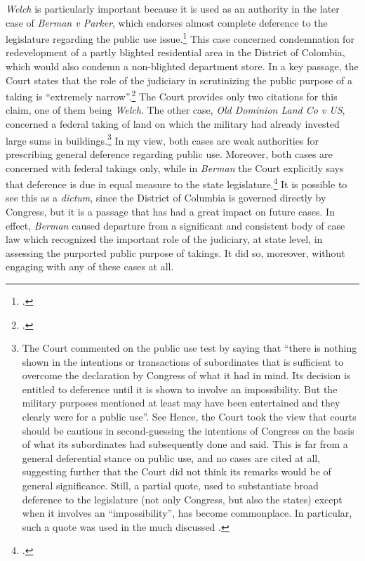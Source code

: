 {\it Welch} is particularly important because it is used as an authority in the later case of {\it Berman v Parker}, which endorses almost complete deference to the legislature regarding the public use issue.\footcite[32]{berman54} This case concerned condemnation for redevelopment of a partly blighted residential area in the District of Colombia, which would also condemn a non-blighted department store. In a key passage, the Court states that the role of the judiciary in scrutinizing the public purpose of a taking is ``extremely narrow''.\footcite[32]{berman54} The Court provides only two citations for this claim, one of them being {\it Welch}. The other case, {\it Old Dominion Land Co v US}, concerned a federal taking of land on which the military had already invested large sums in buildings.\footnote{The Court commented on the public use test by saying that ``there is nothing shown in the intentions or transactions of subordinates that is sufficient to overcome the declaration by Congress of what it had in mind. Its decision is entitled to deference until it is shown to involve an impossibility. But the military purposes mentioned at least may have been entertained and they clearly were for a public use''. See \cite[66]{dominion25} Hence, the Court took the view that courts should be cautious in second-guessing the intentions of Congress on the basis of what its subordinates had subsequently done and said. This is far from a general deferential stance on public use, and no cases are cited at all, suggesting further that the Court did not think its remarks would be of general significance. Still, a partial quote, used to substantiate  broad deference to the legislature (not only Congress, but also the states) except when it involves an ``impossibility'', has become commonplace. In particular, such a quote was used in the much discussed \cite[240]{midkiff}.}
In my view, both cases are weak authorities for prescribing general deference regarding public use. Moreover, both cases are concerned with federal takings only, while in {\it Berman} the Court explicitly says that deference is due in equal measure to the state legislature.\footcite[32]{berman54} It is possible to see this as a {\it dictum}, since the District of Columbia is governed directly by Congress, but it is a passage that has had a great impact on future cases. In effect, {\it Berman} caused departure from a significant and consistent body of case law which recognized the important role of the judiciary, at state level, in assessing the purported public purpose of takings. It did so, moreover, without engaging with any of these cases at all.

